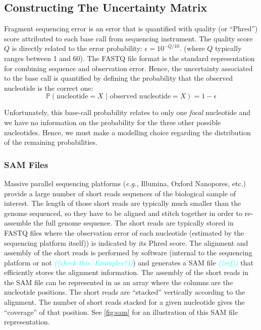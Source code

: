 \documentclass[
]{article}
\newcommand{\comment}[1]{\textsl{\textcolor{cyan}{((#1))}}}
\newcommand{\eg}{\textit{e.g.,}\xspace}
\newcommand{\pr}[1]{\mathbb{P}(#1)}
\begin{document}
\hypertarget{constructing-the-uncertainty-matrix}{%
\subsection{Constructing The Uncertainty
Matrix}\label{constructing-the-uncertainty-matrix}}

Fragment sequencing error is an error that is quantified with quality
(or ``Phred'') score attributed to each base call from sequencing
instrument. The quality score \(Q\) is directly related to the error
probability: \(\epsilon = 10^{-Q/10}\).
\cite{ewingBaseCallingAutomatedSequencer1998} (where \(Q\) typically
ranges between 1 and 60). The FASTQ file format is the standard
representation for combining sequence and observation error. Hence, the
uncertainty associated to the base call is quantified by defining the
probability that the observed nucleotide is the correct one:
\begin{equation}
\label{eq:basecall}
\pr{\text{nucleotide}=X \,\,|\,\, \text{observed nucleotide} = X} = 1 - \epsilon
\end{equation}

Unfortunately, this base-call probability relates to only one
\emph{focal} nucleotide and we have no information on the probability
for the three other possible nucleotides. Hence, we must make a
modelling choice regarding the distribution of the remaining
probabilities.

\hypertarget{sam-files}{%
\subsubsection{SAM Files}\label{sam-files}}

Massive parallel sequencing platforms (\eg Illumina, Oxford Nanopores,
etc.) provide a large number of short reads sequences of the biological
sample of interest. The length of those short reads are typically much
smaller than the genome sequenced, so they have to be aligned and stitch
together in order to re-assemble the full genome sequence. The short
reads are typically stored in FASTQ files where the observation error of
each nucleotide (estimated by the sequencing platform itself)) is
indicated by its Phred score. The alignment and assembly of the short
reads is performed by software (internal to the sequencing platform or
not \comment{check this. Examples?}) and generates a SAM file
\comment{ref} that efficiently stores the alignment information. The
assembly of the short reads in the SAM file can be represented in as an
array where the columns are the nucleotide positions. The short reads
are ``stacked'' vertically according to the alignment. The number of
short reads stacked for a given nucleotide gives the ``coverage'' of
that position. See \autoref{fig:sam} for an illustration of this SAM
file representation.
\end{document}
